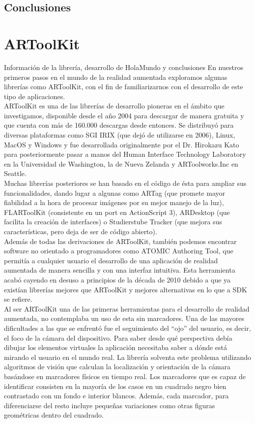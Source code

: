 \subsection{Conclusiones}
\lipsum[1]

\section{ARToolKit}
Información de la librería, desarrollo de HolaMundo y conclusiones
En nuestros primeros pasos en el mundo de la realidad aumentada exploramos algunas librerías como ARToolKit, con el fin de familiarizarnos con el desarrollo de este tipo de aplicaciones.\\
ARToolKit es una de las librerías de desarrollo pioneras en el ámbito que investigamos, disponible desde el año 2004 para descargar de manera gratuita y que cuenta con más de 160.000 descargas desde entonces. Se distribuyó para diversas plataformas como SGI IRIX (que dejó de utilizarse en 2006), Linux, MacOS y Windows y fue desarrollada originalmente por el Dr. Hirokazu Kato para posteriormente pasar a manos del Human Interface Technology Laboratory en la Universidad de Washington, la de Nueva Zelanda y ARToolworks.Inc en Seattle.\\

Muchas librerías posteriores se han basado en el código de ésta para ampliar sus funcionalidades, dando lugar a algunas como ARTag (que promete mayor fiabilidad a la hora de procesar imágenes por su mejor manejo de la luz), FLARToolKit (consistente en un port en ActionScript 3), ARDesktop (que facilita la creación de interfaces) o Studierstube Tracker (que mejora sus características, pero deja de ser de código abierto).\\
Además de todas las derivaciones de ARToolKit, también podemos encontrar software no orientado a programadores como ATOMIC Authoring Tool, que permitía a cualquier usuario el desarrollo de una aplicación de realidad aumentada de manera sencilla y con una interfaz intuitiva. Esta herramienta acabó cayendo en desuso a principios de la década de 2010 debido a que ya existían librerías mejores que ARToolKit y mejores alternativas en lo que a SDK se refiere.\\

Al ser ARToolKit una de las primeras herramientas para el desarrollo de realidad aumentada, no contemplaba un uso de esta sin marcadores. Una de las mayores dificultades a las que se enfrentó fue el seguimiento del “ojo” del usuario, es decir, el foco de la cámara del dispositivo. Para saber desde qué perspectiva debía dibujar los elementos virtuales la aplicación necesitaba saber a dónde está mirando el usuario en el mundo real. La librería solventa este problema utilizando algoritmos de visión que calculan la localización y orientación de la cámara basándose en marcadores físicos en tiempo real.
Los marcadores que es capaz de identificar consisten en la mayoría de los casos en un cuadrado negro bien contrastado con un fondo e interior blancos. Además, cada marcador, para diferenciarse del resto incluye pequeñas variaciones como otras figuras geométricas dentro del cuadrado.\\

